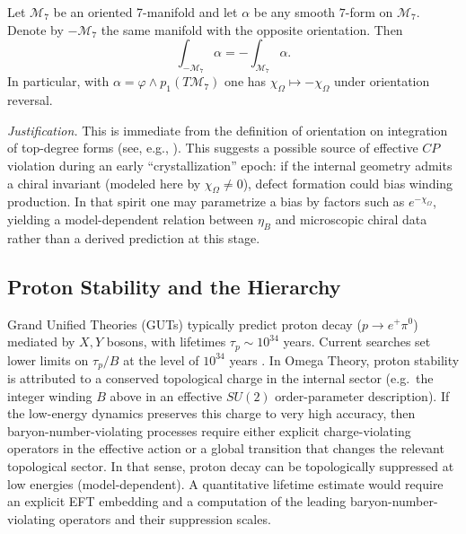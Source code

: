 \begin{lemma}
\label{lemma:chiOmega_orientation}
Let $\mathcal{M}_7$ be an oriented 7-manifold and let $\alpha$ be any smooth $7$-form on $\mathcal{M}_7$. Denote by $-\mathcal{M}_7$ the same manifold with the opposite orientation. Then
\begin{equation}
    \int_{-\mathcal{M}_7}\alpha = -\int_{\mathcal{M}_7}\alpha.
\end{equation}
In particular, with $\alpha=\varphi\wedge p_1(T\mathcal{M}_7)$ one has $\chi_\Omega\mapsto -\chi_\Omega$ under orientation reversal.
\end{lemma}
\noindent\textit{Justification.} This is immediate from the definition of orientation on integration of top-degree forms (see, e.g., \cite{Nakahara2003}).
This suggests a possible source of effective $CP$ violation during an early ``crystallization'' epoch: if the internal geometry admits a chiral invariant (modeled here by $\chi_\Omega\neq 0$), defect formation could bias winding production. In that spirit one may parametrize a bias by factors such as $e^{-\chi_\Omega}$, yielding a model-dependent relation between $\eta_B$ and microscopic chiral data rather than a derived prediction at this stage.

\subsection{Proton Stability and the Hierarchy}
Grand Unified Theories (GUTs) typically predict proton decay ($p \to e^+ \pi^0$) mediated by $X,Y$ bosons, with lifetimes $\tau_p \sim 10^{34}$ years. Current searches set lower limits on $\tau_p/B$ at the level of $10^{34}$ years \cite{SuperK2017ProtonDecay}.
In Omega Theory, proton stability is attributed to a conserved topological charge in the internal sector (e.g.\ the integer winding $B$ above in an effective $SU(2)$ order-parameter description). If the low-energy dynamics preserves this charge to very high accuracy, then baryon-number-violating processes require either explicit charge-violating operators in the effective action or a global transition that changes the relevant topological sector. In that sense, proton decay can be topologically suppressed at low energies (model-dependent). A quantitative lifetime estimate would require an explicit EFT embedding and a computation of the leading baryon-number-violating operators and their suppression scales.

